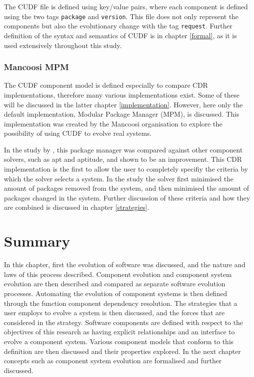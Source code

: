 The CUDF file is defined using key/value pairs, where each component is defined using the two tags \verb+package+ and \verb+version+.
This file does not only represent the components but also the evolutionary change with the tag \verb+request+.
Further definition of the syntax and semantics of CUDF is in chapter \ref{formal}, as it is used extensively throughout this study.

\subsubsection{Mancoosi MPM}
The CUDF component model is defined especially to compare CDR implementations, therefore many various implementations exist.
Some of these will be discussed in the latter chapter \ref{implementation}.
However, here only the default implementation, Modular Package Manager \citep{abate2011} (MPM), is discussed.
This implementation was created by the Mancoosi organisation to explore the possibility of using CUDF to evolve real systems.

In the study by \cite{abate2011}, this package manager was compared against other component solvers, such as apt and aptitude, and shown to be an improvement.
This CDR implementation is the first to allow the user to completely specifiy the criteria by which the solver selects a system.
In the study the solver first minimised the amount of packages removed from the system, and then minimised the amount of packages changed in the system.
Further discussion of these criteria and how they are combined is discussed in chapter \ref{strategies}. 

\section{Summary}
In this chapter, first the evolution of software was discussed, and the nature and laws of this process described.
Component evolution and component system evolution are then described and compared as separate software evolution processes.
Automating the evolution of component systems is then defined through the function component dependency resolution.
The strategies that a user employs to evolve a system is then discussed, and the forces that are considered in the strategy.
Software components are defined with respect to the objectives of this research as having explicit relationships and an interface to evolve a component system.
Various component models that conform to this definition are then discussed and their properties explored.
In the next chapter concepts such as component system evolution are formalised and further discussed.  

